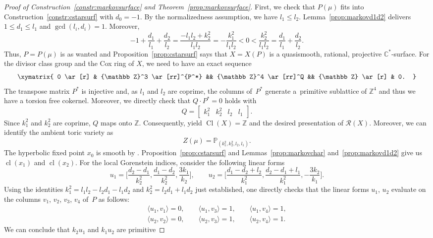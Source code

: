 \documentclass[pdftex]{sigma}
\theoremstyle{definition}
\def\CC{{\mathbb C}}
\def\ZZ{{\mathbb Z}}
\def\PP{{\mathbb P}}
\DeclareMathOperator{\Cl}{Cl}
\DeclareMathOperator{\cl}{cl}
\def\bangle#1{{\langle #1 \rangle}}
\begin{document}
\begin{proof}[Proof of Construction~\ref{constr:markovsurface}
and Theorem~\ref{prop:markovsurface}]
First, we check that $P(\mu)$ fits into
Construction~\ref{constr:cstarsurf} with $d_0=-1$.
By the normalizedness assumption, we have $l_1 \le l_2$.
Lemma~\ref{prop:markovd1d2} delivers $1 \le d_1 \le l_1$
and $\gcd(l_i,d_i)=1$. Moreover,
\[
-1 + \frac{d_1}{l_1} + \frac{d_2}{l_2}
 =
\frac{-l_1l_2 + k_2^2}{l_1l_2}
 =
-\frac{k_1^2}{l_1l_2}
 <
0
 <
\frac{k_2^2}{l_1l_2}
 =
\frac{d_1}{l_1} + \frac{d_2}{l_2}.
\]
Thus, $P = P(\mu)$ is as wanted and
Proposition~\ref{prop:cstarsurf} says that
$X=X(P)$ is a quasismooth, rational,
projective $\CC^*$-surface.
For the divisor class group and the Cox ring of $X$,
we need to have an exact sequence
\[
\xymatrix{
0
\ar[r]
&
\ZZ^3
\ar[rr]^{P^*}
&&
\ZZ^4
\ar[rr]^Q
&&
\ZZ
\ar[r]
&
0.
}
\]
The transpose matrix $P^*$ is injective
and, as $l_1$ and $l_2$ are coprime,
the columns of~$P^*$ generate a~primitive
sublattice of $\ZZ^4$ and thus we have
a torsion free cokernel.
Moreover, we directly check that
$Q \cdot P^* = 0$ holds with
\[
Q = \begin{bmatrix} k_1^2 & k_2^2 & l_2 & l_1 \end{bmatrix}.
\]
Since $k_1^2$ and $k_2^2$ are coprime, $Q$ maps onto $\ZZ$.
Consequently, \cite[Propositions~4.13 and~4.16]{HaHaHaSp} yield
$\Cl(X) = \ZZ$ and the desired presentation of $\mathcal{R}(X)$.
Moreover, we can identify the ambient toric variety as
\[
Z(\mu) = \PP_{(k_1^2, k_2^2, l_2, l_1)}.
\]
The hyperbolic fixed point $x_0$ is smooth by
\cite[Proposition~5.1]{HaHaHaSp}.
Proposition~\ref{prop:cstarsurf} and
Lemmas~\ref{prop:markovchar} and~\ref{prop:markovd1d2}
give us $\cl(x_1)$ and $\cl(x_2)$.
For the local Gorenstein indices, consider
the following linear forms
\[
u_1 = \biggl[\frac{d_2-d_1}{k_2^2}, \frac{d_1-d_2}{k_2^2}, \frac{3k_1}{k_2} \biggr],
\qquad
u_2 = \biggl[\frac{d_1-d_2+l_2}{k_1^2}, \frac{d_2-d_1+l_1}{k_1^2}, - \frac{3k_2}{k_1} \biggr].
\]
Using the identities $k_1^2 = l_1l_2-l_2d_1-l_1d_2$ and $k_2^2 = l_2d_1+l_1d_2$
just established, one directly checks that the linear forms $u_1$, $u_2$ evaluate
on the columns $v_1$, $v_2$, $v_3$, $v_4$ of~$P$ as follows:
\begin{gather*}
\bangle{u_1,v_1} = 0, \qquad
\bangle{u_1,v_3}
= 1, \qquad
\bangle{u_1,v_4}
= 1,
\\
\bangle{u_2,v_2} = 0, \qquad
\bangle{u_2,v_3}
= 1, \qquad
\bangle{u_2,v_4}
= 1.
\end{gather*}
We can conclude that $k_2u_1$ and $k_1u_2$ are primitive

\end{proof}
\end{document}
